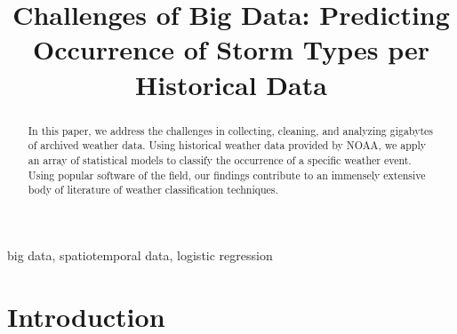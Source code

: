 \documentclass[conference]{IEEEtran}
\begin{document}
\title{Challenges of Big Data: Predicting Occurrence of Storm Types per Historical Data}
\author{
\and
{}
\and
{}
}

\maketitle

\begin{abstract}

In this paper, we address the challenges in collecting, cleaning, and analyzing gigabytes of archived weather data. Using historical weather data provided by NOAA, we apply an array of statistical models to classify the occurrence of a specific weather event. Using popular software of the field, our findings contribute to an immensely extensive body of literature of weather classification techniques.

\end{abstract}

\begin{IEEEkeywords}
big data, spatiotemporal data, logistic regression
\end{IEEEkeywords}

\section{Introduction}
\end{document}
